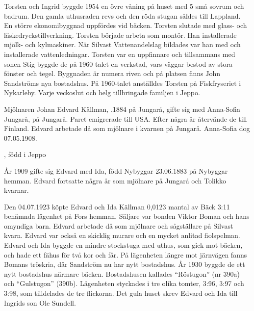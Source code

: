 Torsten och Ingrid byggde 1954 en övre våning på huset med 5 små sovrum och badrum. Den gamla uthusraden revs och den röda stugan såldes till Lappland. En större ekonomibyggnad uppfördes vid bäcken. Torsten slutade med glass- och läskedryckstillverkning. Torsten började arbeta som montör. Han installerade mjölk- och kylmaskiner. När Silvast	Vattenandelslag bildades var han med och installerade vattenledningar. Torsten var en uppfinnare och tillsammans med sonen Stig byggde de på 1960-talet en verkstad, vars väggar bestod av stora fönster och tegel. 	Byggnaden är numera riven och på platsen finns John Sandströms nya 	bostadshus. På 1960-talet anställdes Torsten på Fiskfryseriet i Nykarleby. Varje veckoslut och helg tillbringade familjen i Jeppo.

Mjölnaren Johan Edvard Källman, .1884 på Jungarå, gifte sig med Anna-Sofia Jungarå,  på Jungarå. Paret 	emigrerade till USA. Efter några år återvände de till Finland. Edvard arbetade då som mjölnare i kvarnen på Jungarå. Anna-Sofia dog 	07.05.1908.
\begin{jhchildren}
  \item {}
  \item {}
  \item {}, född i Jeppo
\end{jhchildren}

År 1909 gifte sig Edvard med Ida, född Nybyggar 23.06.1883 på Nybyggar hemman. Edvard fortsatte några år som mjölnare på Jungarå och Tolikko kvarnar.
\begin{jhchildren}
  \item {}
  \item {}
\end{jhchildren}

Den 04.07.1923 köpte Edvard och Ida Källman 0,0123 mantal av Bäck 3:11 benämnda lägenhet på Fors hemman. Säljare var bonden Viktor Boman och hans omyndiga barn. Edvard arbetade då som mjölnare och sågställare på Silvast kvarn. Edvard var också en skicklig murare och en mycket anlitad fiolspelman. Edvard och Ida byggde en mindre stockstuga	med uthus, som gick mot bäcken, och hade ett fähus för två kor och får. På lägenheten längre mot järnvägen fanns Bomans tröskria, där 	Sandström nu har nytt bostadshus. År 1930 byggde de ett nytt bostadshus närmare bäcken. Bostadshusen kallades ``Röstugon'' (nr 390a) och 	``Gulstugon'' (390b). Lägenheten styckades i tre olika tomter, 3:96, 3:97 och 	3:98, som tilldelades de tre flickorna. Det gula huset skrev Edvard och Ida till Ingrids son Ole Sundell.

